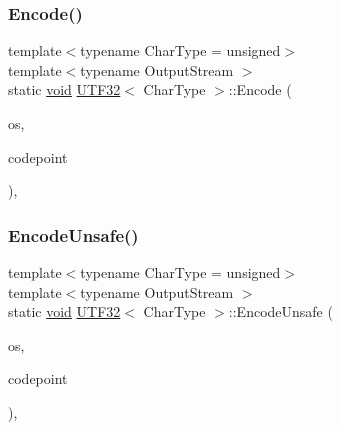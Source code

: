 \subsubsection{\texorpdfstring{Encode()}{Encode()}}
{\footnotesize\ttfamily template$<$typename Char\+Type  = unsigned$>$ \\
template$<$typename Output\+Stream $>$ \\
static \hyperlink{imgui__impl__opengl3__loader_8h_ac668e7cffd9e2e9cfee428b9b2f34fa7}{void} \hyperlink{structUTF32}{U\+T\+F32}$<$ Char\+Type $>$\+::Encode (\begin{DoxyParamCaption}\item[{Output\+Stream \&}]{os,  }\item[{unsigned}]{codepoint }\end{DoxyParamCaption})\hspace{0.3cm}{\ttfamily [inline]}, {\ttfamily [static]}}

\mbox{\label{structUTF32_ae50dd8dff92c36ee184c6d4eccb1961e}} 
\subsubsection{\texorpdfstring{Encode\+Unsafe()}{EncodeUnsafe()}}
{\footnotesize\ttfamily template$<$typename Char\+Type  = unsigned$>$ \\
template$<$typename Output\+Stream $>$ \\
static \hyperlink{imgui__impl__opengl3__loader_8h_ac668e7cffd9e2e9cfee428b9b2f34fa7}{void} \hyperlink{structUTF32}{U\+T\+F32}$<$ Char\+Type $>$\+::Encode\+Unsafe (\begin{DoxyParamCaption}\item[{Output\+Stream \&}]{os,  }\item[{unsigned}]{codepoint }\end{DoxyParamCaption})\hspace{0.3cm}{\ttfamily [inline]}, {\ttfamily [static]}}

\mbox{\label{structUTF32_aae11b766f799d311679d59e9f7077f83}} 
